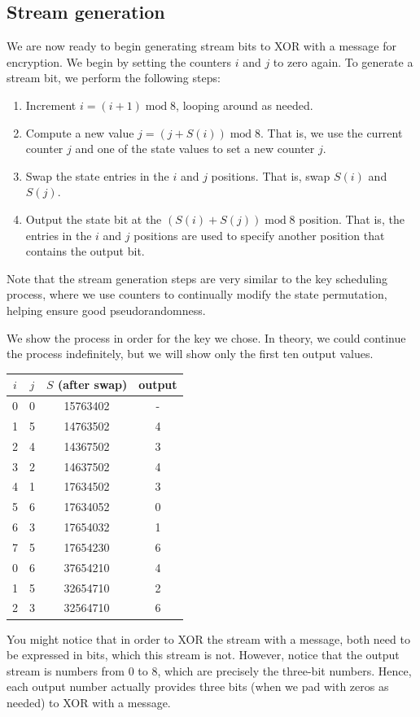 \documentclass{book}
\theoremstyle{plain}
\theoremstyle{definition}
\renewcommand{\mod}{\operatorname{mod}}
\renewcommand{\mod}{\operatorname{mod}}
\begin{document}
\subsection{Stream generation}
We are now ready to begin generating stream bits to XOR with a message for encryption. We begin by setting the counters $i$ and $j$ to zero again. To generate a stream bit, we perform the following steps:
\begin{enumerate}
\item Increment $i = (i+1) \mod 8$, looping around as needed.
\item Compute a new value $j = (j + S(i)) \mod 8$. That is, we use the current counter $j$ and one of the state values to set a new counter $j$.
\item Swap the state entries in the $i$ and $j$ positions. That is, swap $S(i)$ and $S(j)$.
\item Output the state bit at the $(S(i) + S(j)) \mod 8$ position. That is, the entries in the $i$ and $j$ positions are used to specify another position that contains the output bit.
\end{enumerate}
Note that the stream generation steps are very similar to the key scheduling process, where we use counters to continually modify the state permutation, helping ensure good pseudorandomness.

We show the process in order for the key we chose. In theory, we could continue the process indefinitely, but we will show only the first ten output values.
\begin{center}
\begin{tabular}{cccc}
$i$ & $j$ & $S$ (after swap) & output \\
\hline
0 & 0 & 15763402 & - \\
1 & 5 & 14763502 & 4 \\
2 & 4 & 14367502 & 3 \\
3 & 2 & 14637502 & 4 \\
4 & 1 & 17634502 & 3 \\
5 & 6 & 17634052 & 0 \\
6 & 3 & 17654032 & 1 \\
7 & 5 & 17654230 & 6 \\
0 & 6 & 37654210 & 4 \\
1 & 5 & 32654710 & 2 \\
2 & 3 & 32564710 & 6
\end{tabular}
\end{center}

You might notice that in order to XOR the stream with a message, both need to be expressed in bits, which this stream is not. However, notice that the output stream is numbers from $0$ to $8$, which are precisely the three-bit numbers. Hence, each output number actually provides three bits (when we pad with zeros as needed) to XOR with a message.
\end{document}
